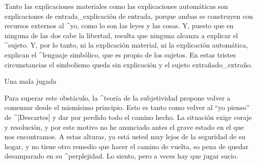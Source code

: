 Tanto las explicaciones materiales como las explicaciones automáticas
son explicaciones de entrada_{explicación de entrada}, porque ambas se
construyen con recursos externos al ^{yo}, como lo son las leyes y las
cosas. Y, puesto que en ninguna de las dos cabe la libertad, resulta que
ninguna alcanza a explicar el ^{sujeto}. Y, por lo tanto, ni la
explicación material, ni la explicación automática, explican el
^{lenguaje simbólico}, que es propio de los sujetos.  En estas tristes
circunstancias el simbolismo queda sin explicación y el sujeto
extrañado_{extraño}.


\Section Una mala jugada

Para superar este obstáculo, la ^{teoría de la subjetividad} propone
volver a comenzar desde el mismísimo principio. Esto es tanto como
volver al ``yo pienso'' de ^[Descartes] y dar por perdido todo el camino
hecho. La situación exige coraje y resolución, y por este motivo no he
anunciado antes el grave estado en el que nos encontramos. A estas
alturas, ya está usted muy lejos de la seguridad de su hogar, y no tiene
otro remedio que hacer el camino de vuelta, so pena de quedar
desamparado en su ^{perplejidad}. Lo siento, pero a veces hay que jugar
sucio.


\endinput
